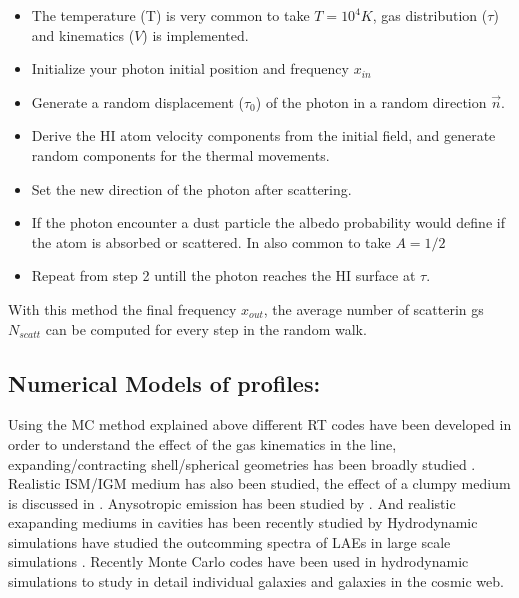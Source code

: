 \begin{itemize}
\item  The temperature (T) is very common to take $T=10^4K$, gas distribution ($\tau$) and kinematics ($V$) is implemented. 

\item Initialize your \ly photon initial position and frequency $x_{in}$

\item Generate a random displacement ($\tau_0$) of the photon in a random 
direction {\bf{$\vec{n}$}}.

\item  Derive the HI atom velocity components from the initial field, 
and generate random components for the thermal movements.

\item  Set the new direction of the \ly photon after scattering.

\item If the \ly photon encounter a dust particle the albedo probability 
would define if the atom is absorbed or scattered. In also common to take $A=1/2$

\item Repeat from step 2 untill the photon reaches the HI surface at $\tau$.  

\end{itemize}

With this method the final frequency $x_{out}$, the average number of scatterin
gs $N_{scatt}$ can be computed for every step in the random walk.


\subsection{Numerical Models of \ly profiles:}

Using the MC method explained above different RT  codes 
\citep{DijkstraKramer, Laursen09, Verhamme06, CLARA}
have been developed in order to understand the effect of the gas kinematics in
the \lya line, expanding/contracting shell/spherical geometries
has been broadly studied \citep{Ahn03,Verhamme06,Dijkstra06}.
Realistic ISM/IGM medium has also been studied, the effect of a clumpy
medium is discussed in \citep{Hansen06}. Anysotropic \ly emission 
has been studied by \citep{Zheng2013}. And realistic exapanding mediums 
in cavities has been recently studied by  \citep{Behrens2014} 
Hydrodynamic simulations have studied the outcomming spectra of
LAEs in large scale simulations \cite{Forero12}. 
Recently Monte Carlo codes have been used in hydrodynamic 
simulations to study in detail individual galaxies and galaxies 
in the cosmic web.
\citep{Laursen09,Barnes11,Verhamme12,Yajima12}

